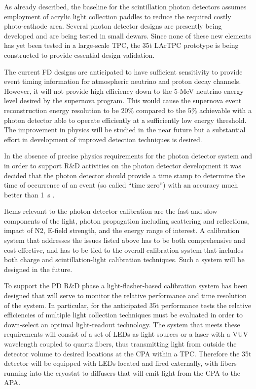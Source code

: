 As already described, the
baseline \fixme{} for the scintillation photon detectors assumes employment of
acrylic light collection paddles to reduce the required costly
photo-cathode area. Several photon detector designs are presently
being developed and are being tested in small dewars. Since %
none of
these new elements has %
yet been tested in a large-scale TPC, the
35t LArTPC prototype is being constructed to provide essential
design validation. 

The current FD designs are anticipated to have
sufficient sensitivity to provide event timing information for
atmospheric neutrino and proton decay channels. However, it will not
provide high efficiency down to the 5-MeV neutrino energy level
desired by the supernova program. %
This would cause the supernova event reconstruction energy resolution to be 20\% compared to the 5\%
achievable with %
a photon detector
able to operate efficiently at a sufficiently low energy
threshold. The improvement in physics will be studied in the near
future but a substantial effort in development of improved detection
techniques is desired. 

In the absence of precise physics requirements
for the photon detector system and in order to support R\&D activities
on the photon detector development it was decided that the photon
detector should provide a time stamp to determine the time of
occurrence of an event (so called ``time zero'') with an accuracy much
better than 1~s .  

Items relevant to the photon detector calibration
are the fast and slow components of the light, photon propagation
including scattering and reflections, impact of N2,  E-field strength,
and the energy range of interest. A calibration system that
addresses the issues listed above has to be both comprehensive and
cost-effective, and has to be tied to the overall calibration system
that includes both charge and scintillation-light calibration
techniques. Such a system will be designed in the future.  

To support
the PD R\&D phase a light-flasher-based calibration system
has been designed
that will serve to monitor the relative performance and time
resolution of the system. In particular, for the anticipated 35t
performance tests the relative efficiencies of
multiple light collection techniques must be evaluated in order to 
down-select an optimal light-readout technology. The system that meets
these requirements will consist of a set of LEDs as light sources or a
laser with a VUV wavelength coupled to quartz fibers, thus
transmitting light from outside the detector volume to desired
locations at the CPA within a TPC. Therefore the 35t
detector will be equipped with LEDs located and fired externally, with fibers running
into the cryostat to diffusers that will emit light from the CPA to
the APA. 

